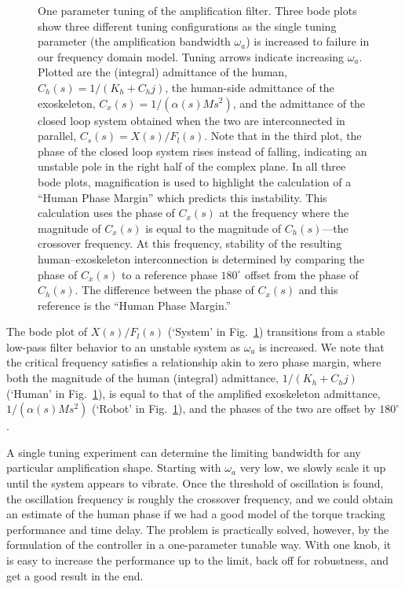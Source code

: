\documentclass[utf8]{frontiersSCNS}
\begin{document}
\begin{figure}
	\centering
	\resizebox{1\textwidth}{!}{
	\def\svgwidth{\textwidth}
	{%
		}}
	\caption{One parameter tuning of the amplification filter. Three bode plots show three different tuning configurations as the single tuning parameter (the amplification bandwidth $\omega_a$) is increased to failure in our frequency domain model. Tuning arrows indicate increasing $\omega_a$. Plotted are the (integral) admittance of the human, $C_h(s)=1/(K_h+C_hj)$, the human-side admittance of the exoskeleton, $C_x(s)=1/(\alpha(s)Ms^2)$, and the admittance of the closed loop system obtained when the two are interconnected in parallel, $C_s(s) = X(s)/F_l(s)$. Note that in the third plot, the phase of the closed loop system rises instead of falling, indicating an unstable pole in the right half of the complex plane. In all three bode plots, magnification is used to highlight the calculation of a ``Human Phase Margin'' which predicts this instability. This calculation uses the phase of $C_x(s)$ at the frequency where the magnitude of $C_x(s)$ is equal to the magnitude of $C_h(s)$---the crossover frequency. At this frequency, stability of the resulting human--exoskeleton interconnection is determined by comparing the phase of $C_x(s)$ to a reference phase $180^\circ$ offset from the phase of $C_h(s)$. The difference between the phase of $C_x(s)$ and this reference is the ``Human Phase Margin.'' }\label{fig:oneptune}
\end{figure}

The bode plot of $X(s)/F_l(s)$ (`System' in Fig.~\ref{fig:oneptune}) transitions from a stable low-pass filter behavior to an unstable system as $\omega_a$ is increased. We note that the critical frequency satisfies a relationship akin to zero phase margin, where both the magnitude of the human (integral) admittance, $1/(K_h+C_hj)$ (`Human' in Fig.~\ref{fig:oneptune}), is equal to that of the amplified exoskeleton admittance, $1/(\alpha(s)Ms^2)$ (`Robot' in Fig.~\ref{fig:oneptune}), and the phases of the two are offset by $180^\circ$. 

A single tuning experiment can determine the limiting bandwidth for any particular amplification shape.
Starting with $\omega_a$ very low, we slowly scale it up until the system appears to vibrate. Once the threshold of oscillation is found, the oscillation frequency is roughly the crossover frequency, and we could obtain an estimate of the human phase if we had a good model of the torque tracking performance and time delay. The problem is practically solved, however, by the formulation of the controller in a one-parameter tunable way. With one knob, it is easy to increase the performance up to the limit, back off for robustness, and get a good result in the end.
\end{document}
